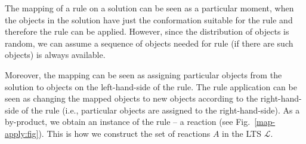 \documentclass[12pt]{fithesis2}
\begin{document}
The mapping of a rule on a solution can be seen as a particular moment, when the objects in the solution have just the conformation suitable for the rule and therefore the rule can be applied. However, since the distribution of objects is random, we can assume a sequence of objects needed for rule (if there are such objects) is always available.

Moreover, the mapping can be seen as assigning particular objects from the solution to objects on the left-hand-side of the rule. The rule application can be seen as changing the mapped objects to new objects according to the right-hand-side of the rule (i.e., particular objects are assigned to the right-hand-side). As a by-product, we obtain an instance of the rule -- a reaction (see Fig.~\ref{map-apply:fig}). This is how we construct the set of reactions $A$ in the LTS $\mathcal{L}$.
\end{document}
